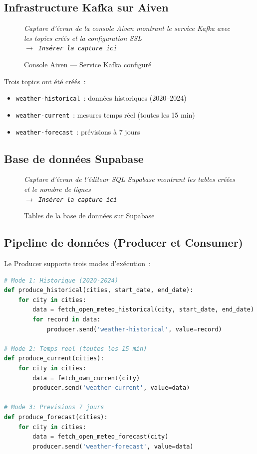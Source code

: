 \documentclass[a4paper,12pt,oneside]{report}
\newcommand{\imgplaceholder}[2]{%
  \begin{tcolorbox}[colback=blue!5,colframe=blue!40,title=#1]
    \centering\itshape #2\\[6pt]
    \texttt{$\rightarrow$ Insérer la capture ici}
  \end{tcolorbox}
}
\begin{document}
\subsection{Infrastructure Kafka sur Aiven}

\begin{figure}[H]
\centering
\imgplaceholder{Figure~\ref{fig:aiven_console} — Console Aiven}{Capture d'écran de la console Aiven montrant le service Kafka avec les topics créés et la configuration SSL}
\caption{Console Aiven — Service Kafka configuré}
\label{fig:aiven_console}
\end{figure}

Trois topics ont été créés~:
\begin{itemize}
  \item \texttt{weather-historical}~: données historiques (2020--2024)
  \item \texttt{weather-current}~: mesures temps réel (toutes les 15 min)
  \item \texttt{weather-forecast}~: prévisions à 7 jours
\end{itemize}

\subsection{Base de données Supabase}

\begin{figure}[H]
\centering
\imgplaceholder{Figure~\ref{fig:supabase_tables} — Tables Supabase}{Capture d'écran de l'éditeur SQL Supabase montrant les tables créées et le nombre de lignes}
\caption{Tables de la base de données sur Supabase}
\label{fig:supabase_tables}
\end{figure}

\subsection{Pipeline de données (Producer et Consumer)}

Le Producer supporte trois modes d'exécution~:

\begin{lstlisting}[language=Python,caption={Extrait du Producer tri-mode}]
# Mode 1: Historique (2020-2024)
def produce_historical(cities, start_date, end_date):
    for city in cities:
        data = fetch_open_meteo_historical(city, start_date, end_date)
        for record in data:
            producer.send('weather-historical', value=record)

# Mode 2: Temps reel (toutes les 15 min)
def produce_current(cities):
    for city in cities:
        data = fetch_owm_current(city)
        producer.send('weather-current', value=data)

# Mode 3: Previsions 7 jours
def produce_forecast(cities):
    for city in cities:
        data = fetch_open_meteo_forecast(city)
        producer.send('weather-forecast', value=data)
\end{lstlisting}
\end{document}
